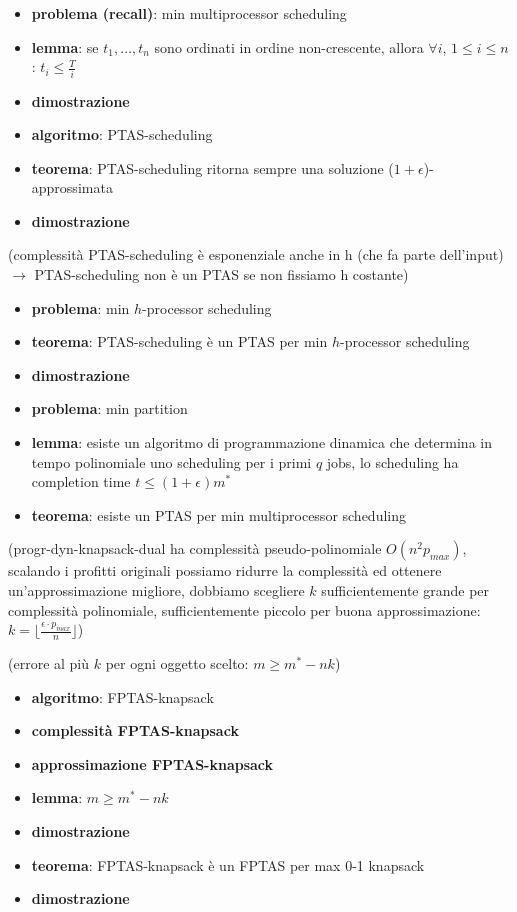     \begin{itemize}

\item
  \textbf{problema (recall)}: min multiprocessor scheduling
\item
  \textbf{lemma}: se \(t_1,\dots,t_n\) sono ordinati in ordine
  non-crescente, allora \(\forall i\), \(1 \leq i \leq n\):
  \(t_i \leq {\frac{T}{i}}\)
\item
  \textbf{dimostrazione}
\item
  \textbf{algoritmo}: PTAS-scheduling
\item
  \textbf{teorema}: PTAS-scheduling ritorna sempre una soluzione
  (\(1+\epsilon\))-approssimata
\item
  \textbf{dimostrazione}
\end{itemize}

(complessità PTAS-scheduling è esponenziale anche in h (che fa parte
dell'input) \(\rightarrow\) PTAS-scheduling non è un PTAS se non
fissiamo h costante)

\begin{itemize}

\item
  \textbf{problema}: min \(h\)-processor scheduling
\item
  \textbf{teorema}: PTAS-scheduling è un PTAS per min \(h\)-processor
  scheduling
\item
  \textbf{dimostrazione}
\item
  \textbf{problema}: min partition
\item
  \textbf{lemma}: esiste un algoritmo di programmazione dinamica che
  determina in tempo polinomiale uno scheduling per i primi \(q\) jobs,
  lo scheduling ha completion time \(t \leq (1+\epsilon)m^*\)
\item
  \textbf{teorema}: esiste un PTAS per min multiprocessor scheduling
\end{itemize}

    (progr-dyn-knapsack-dual ha complessità pseudo-polinomiale
\(O(n^2p_{max})\), scalando i profitti originali possiamo ridurre la
complessità ed ottenere un'approssimazione migliore, dobbiamo scegliere
\(k\) sufficientemente grande per complessità polinomiale,
sufficientemente piccolo per buona approssimazione:
\(k=\lfloor {\frac{\epsilon \cdot p_{max}}{n}} \rfloor\))

(errore al più \(k\) per ogni oggetto scelto: \(m \geq m^* - nk\))

\begin{itemize}

\item
  \textbf{algoritmo}: FPTAS-knapsack
\item
  \textbf{complessità FPTAS-knapsack}
\item
  \textbf{approssimazione FPTAS-knapsack}
\item
  \textbf{lemma}: \(m \geq m^* - nk\)
\item
  \textbf{dimostrazione}
\item
  \textbf{teorema}: FPTAS-knapsack è un FPTAS per max 0-1 knapsack
\item
  \textbf{dimostrazione}
\end{itemize}

